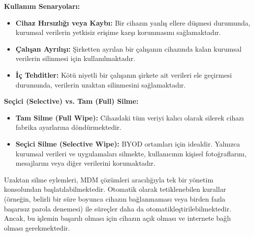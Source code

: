 \textbf{Kullanım Senaryoları:}
\begin{itemize}
    \item \textbf{Cihaz Hırsızlığı veya Kaybı:} Bir cihazın yanlış ellere düşmesi durumunda, kurumsal verilerin yetkisiz erişime karşı korunmasını sağlamaktadır.
    \item \textbf{Çalışan Ayrılışı:} Şirketten ayrılan bir çalışanın cihazında kalan kurumsal verilerin silinmesi için kullanılmaktadır.
    \item \textbf{İç Tehditler:} Kötü niyetli bir çalışanın şirkete ait verileri ele geçirmesi durumunda, verilerin uzaktan silinmesini sağlamaktadır.
\end{itemize}

\textbf{Seçici (Selective) vs. Tam (Full) Silme:}
\begin{itemize}
    \item \textbf{Tam Silme (Full Wipe):} Cihazdaki tüm veriyi kalıcı olarak silerek cihazı fabrika ayarlarına döndürmektedir.
    \item \textbf{Seçici Silme (Selective Wipe):} BYOD ortamları için idealdir. Yalnızca kurumsal verileri ve uygulamaları silmekte, kullanıcının kişisel fotoğraflarını, mesajlarını veya diğer verilerini korumaktadır.
\end{itemize}

Uzaktan silme eylemleri, MDM çözümleri aracılığıyla tek bir yönetim konsolundan başlatılabilmektedir. Otomatik olarak tetiklenebilen kurallar (örneğin, belirli bir süre boyunca cihazın bağlanmaması veya birden fazla başarısız parola denemesi) ile süreçler daha da otomatikleştirilebilmektedir. Ancak, bu işlemin başarılı olması için cihazın açık olması ve internete bağlı olması gerekmektedir.
